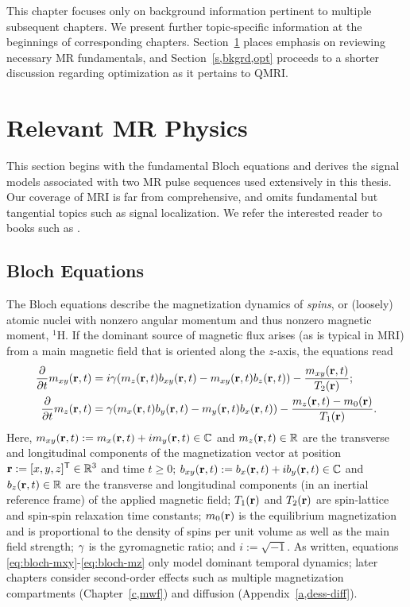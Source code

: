 
This chapter focuses
only on background information 
pertinent to multiple subsequent chapters.
We present further topic-specific information 
at the beginnings 
of corresponding chapters.
Section~\ref{s,bkgrd,mri} places emphasis
on reviewing necessary MR fundamentals,
and Section~\ref{s,bkgrd,opt}
proceeds to a shorter discussion
regarding optimization
as it pertains to QMRI.

\section{Relevant MR Physics}
\label{s,bkgrd,mri}

This section begins
with the fundamental Bloch equations
and derives the signal models
associated with 
two MR pulse sequences
used extensively in this thesis.
Our coverage of MRI
is far from comprehensive, 
and omits fundamental but tangential topics
such as signal localization.
We refer the interested reader
to books such as 
\cite{macovski:83,haacke:99,nishimura:96:pom}.

\subsection{Bloch Equations}
\label{ss,bkgrd,mri,bloch}

The Bloch equations
\cite{bloch:1946:ni-paper}
describe the magnetization dynamics
of \emph{spins}, 
or (loosely) atomic nuclei with nonzero 
angular momentum
and thus nonzero magnetic moment,
\eg $^1$H.
If the dominant source
of magnetic flux 
arises 
(as is typical in MRI)
from a main magnetic field
that is oriented along the $z$-axis,
the equations read
\begin{align}
	\dela{t} \mxy\prt &= i\gam\paren{\mz\prt \bxy\prt - \mxy\prt \bz\prt} -
		\frac{\mxy\prt}{\Tt\pr} ;
		\label{eq:bloch-mxy} \\
	\dela{t} \mz\prt &= \gam\paren{\mx\prt \by\prt - \my\prt \bx\prt} - 
		\frac{\mz\prt - \mzero\pr}{\To\pr}.
		\label{eq:bloch-mz}
\end{align}
Here, 
$\mxy\prt := \mx\prt + i\my\prt \in \complex$
and
$\mz\prt \in \real$
are the transverse and longitudinal components 
of the magnetization vector
at position $\mathbf{r} := [x, y, z]^{\mathsf{T}} \in \mathbb{R}^{3}$ 
and time $t\geq0$;
$\bxy\prt := \bx\prt + i\by\prt \in \complex$
and 
$\bz\prt \in \real$
are the transverse and longitudinal components 
(in an inertial reference frame)
of the applied magnetic field;
$\To\pr$ and $\Tt\pr$
are spin-lattice and spin-spin relaxation time constants;
$\mzero\pr$ 
is the equilibrium magnetization
and is proportional to the density
of spins per unit volume
as well as the main field strength;
$\gamma$
is the gyromagnetic ratio;
and $i := \sqrt{-1}$.
As written,
equations \eqref{eq:bloch-mxy}-\eqref{eq:bloch-mz}
only model dominant temporal dynamics;
later chapters consider second-order effects
such as multiple magnetization compartments
(Chapter~\ref{c,mwf})
and diffusion
(Appendix~\ref{a,dess-diff}).

